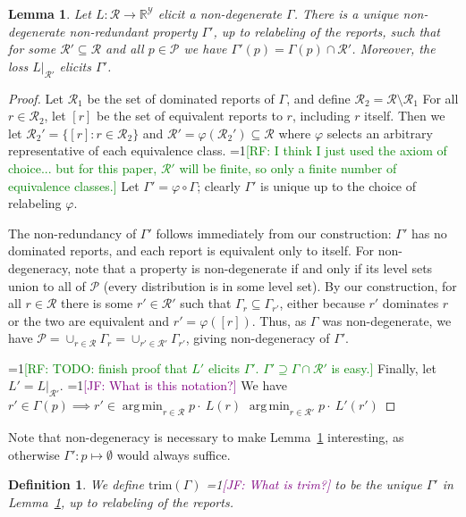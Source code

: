 \documentclass[12pt]{article}
\newcommand{\Comments}{1}
\newcommand{\mynote}[2]{\ifnum\Comments=1\textcolor{#1}{#2}\fi}
\newcommand{\raf}[1]{\mynote{green}{[RF: #1]}}
\newcommand{\jessie}[1]{\mynote{purple}{[JF: #1]}}
\newcommand{\reals}{\mathbb{R}}
\renewcommand{\P}{\mathcal{P}}
\newcommand{\R}{\mathcal{R}}
\newcommand{\Y}{\mathcal{Y}}
\renewcommand{\P}{\mathcal{P}}
\newcommand{\trim}{\mathrm{trim}}
\DeclareMathOperator*{\argmin}{arg\,min}
\newtheorem{lemma}{Lemma}
\newtheorem{definition}{Definition}
\begin{document}
\begin{lemma}\label{lem:trim}
  Let $L:\R\to\reals^\Y$ elicit a non-degenerate $\Gamma$.
  There is a unique non-degenerate non-redundant property $\Gamma'$, up to relabeling of the reports, such that for some $\R'\subseteq\R$ and all $p\in\P$ we have $\Gamma'(p) = \Gamma(p)\cap\R'$.
  Moreover, the loss $L|_{\R'}$ elicits $\Gamma'$.
\end{lemma}
\begin{proof}
  Let $\R_1$ be the set of dominated reports of $\Gamma$, and define $\R_2 = \R\setminus\R_1$
  For all $r \in \R_2$, let $[r]$ be the set of equivalent reports to $r$, including $r$ itself.
  Then we let $\R_2' = \{[r] : r\in\R_2\}$ and $\R' = \varphi(\R_2') \subseteq \R$ where $\varphi$ selects an arbitrary representative of each equivalence class.
  \raf{I think I just used the axiom of choice... but for this paper, $\R'$ will be finite, so only a finite number of equivalence classes.}
  Let $\Gamma' = \varphi \circ \Gamma$; clearly $\Gamma'$ is unique up to the choice of relabeling $\varphi$.

  The non-redundancy of $\Gamma'$ follows immediately from our construction: $\Gamma'$ has no dominated reports, and each report is equivalent only to itself.
  For non-degeneracy, note that a property is non-degenerate if and only if its level sets union to all of $\P$ (every distribution is in some level set).
  By our construction, for all $r\in\R$ there is some $r'\in\R'$ such that $\Gamma_{r} \subseteq \Gamma_{r'}$, either because $r'$ dominates $r$ or the two are equivalent and $r' = \varphi([r])$.
  Thus, as $\Gamma$ was non-degenerate, we have $\P = \cup_{r\in\R} \Gamma_r = \cup_{r'\in\R'} \Gamma_{r'}$, giving non-degeneracy of $\Gamma'$.

\raf{TODO: finish proof that $L'$ elicits $\Gamma'$.  $\Gamma' \supseteq \Gamma \cap \R'$ is easy.}
  Finally, let $L' = L|_{\R'}$.
  \jessie{What is this notation?}
  We have $r' \in \Gamma(p) \implies r' \in \argmin_{r\in\R} p\cdot~L(r)$ $ \argmin_{r\in\R'} p\cdot~L'(r') $
\end{proof}
Note that non-degeneracy is necessary to make Lemma~\ref{lem:trim} interesting, as otherwise $\Gamma' : p \mapsto \emptyset$ would always suffice.


\begin{definition}\label{def:trim}
  We define $\trim(\Gamma)$ \jessie{What is trim?} to be the unique $\Gamma'$ in Lemma~\ref{lem:trim}, up to relabeling of the reports.
\end{definition}
\end{document}
